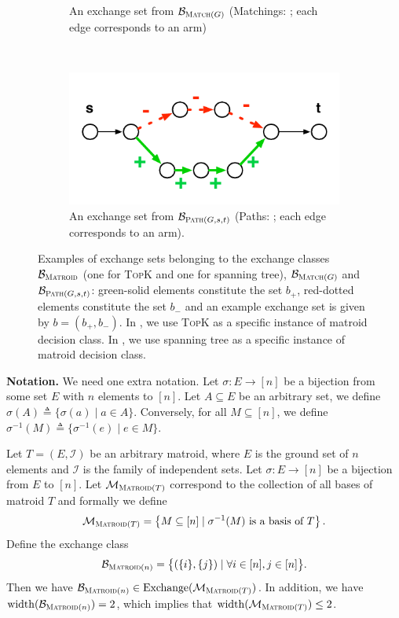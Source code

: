 \documentclass{article}
\newcommand{\M}{\mathcal M}
\newcommand{\B}{\mathcal B}
\DeclareMathOperator{\rank}{width}
\DeclareMathOperator{\Exchange}{Exchange}
\newcommand{\MultiIdent}{\textsc{TopK}\xspace}
\newcommand{\Matroid}{\textsc{Matroid}\xspace}
\newcommand{\Match}{\textsc{Match}\xspace}
\newcommand{\Path}{\textsc{Path}\xspace}
\begin{document}
\begin{figure}[ht]
\begin{subfigure}[c]{0.45\textwidth}
	\caption{An exchange set from $\B_{\Match(G)}$ (Matchings: ; each edge corresponds to an arm) }
\end{subfigure}
~
\begin{subfigure}[c]{0.45\textwidth}
	\includegraphics[width=\textwidth]{fig/exchange-path}
	\caption{An exchange set from $\B_{\Path(G,s,t)}$ (Paths: ; each edge corresponds to an arm).}
\end{subfigure}
\caption{
Examples of exchange sets belonging to the exchange classes $\B_{\Matroid}$ (one for \MultiIdent and one for spanning tree), $\B_{\Match(G)}$ and $\B_{\Path(G,s,t)}$:
green-solid elements constitute the set $b_+$, red-dotted elements constitute the set $b_-$ and an example exchange set is given by $b=(b_+,b_-)$. 
In , we use \MultiIdent as a specific instance of matroid decision class.
In , we use spanning tree as a specific instance of matroid decision class.
}
\label{fig:exchange}
\end{figure}

\textbf{Notation.} We need one extra notation.
Let $\sigma: E\rightarrow [n]$ be a bijection from some set $E$ with $n$ elements to $[n]$.
Let $A\subseteq E$ be an arbitrary set, we define $\sigma(A) \triangleq \{\sigma(a) \mid  a\in A\}$.
Conversely, for all $M\subseteq[n]$, we define $\sigma^{-1}(M) \triangleq \{\sigma^{-1}(e) \mid e\in M\}$.

\begin{fact}[Matroid]
\label{fact:matroid}
Let $T=(E,\mathcal I)$ be an arbitrary matroid, where $E$ is the ground set of $n$ elements and $\mathcal I$ is the family of independent sets.
Let $\sigma\colon E\rightarrow [n]$ be a bijection from $E$ to $[n]$.
Let $\M_{\Matroid(T)}$ correspond to the collection of all bases of matroid $T$ and formally we define
\begin{equation}
\label{eq:matroid}
\M_{\Matroid(T)} = \left\{M\subseteq[n] \mid \sigma^{-1}(M)\text{ is a basis of } T\right\}.
\end{equation}
Define the exchange class
\begin{equation}
\label{eq:bmatroid}
\B_{\Matroid(n)}=\big\{(\{i\},\{j\})\mid\forall i\in [n], j\in [n]\big\}.
\end{equation}
Then we have $\B_{\Matroid(n)} \in \Exchange(\M_{\Matroid(T)})$.
In addition, we have $\rank(\B_{\Matroid(n)}) = 2$, which implies that $\rank(\M_{\Matroid(T)}) \le 2$. 
\end{fact}
\end{document}
